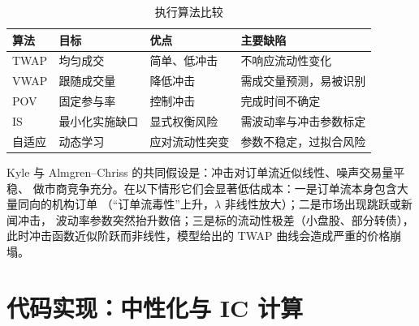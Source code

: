 \begin{table}[htbp]
\centering
\caption{执行算法比较}\label{tab:07-exec}
\tablefont
\begin{tabular}{@{}llll@{}}
\toprule
算法 & 目标 & 优点 & 主要缺陷 \\
\midrule
TWAP & 均匀成交 & 简单、低冲击 & 不响应流动性变化 \\
VWAP & 跟随成交量 & 降低冲击 & 需成交量预测，易被识别 \\
POV & 固定参与率 & 控制冲击 & 完成时间不确定 \\
IS & 最小化实施缺口 & 显式权衡风险 & 需波动率与冲击参数标定 \\
自适应 & 动态学习 & 应对流动性突变 & 参数不稳定，过拟合风险 \\
\bottomrule
\end{tabular}
\end{table}

\begin{warningbox}[微观结构模型的失效条件]
Kyle 与 Almgren--Chriss 的共同假设是：冲击对订单流近似线性、噪声交易量平稳、
做市商竞争充分。在以下情形它们会显著低估成本：一是订单流本身包含大量同向的机构订单
（“订单流毒性”上升，$\lambda$ 非线性放大）；二是市场出现跳跃或新闻冲击，
波动率参数突然抬升数倍；三是标的流动性极差（小盘股、部分转债），
此时冲击函数近似阶跃而非线性，模型给出的 TWAP 曲线会造成严重的价格崩塌。
\end{warningbox}

\section{代码实现：中性化与 IC 计算}

